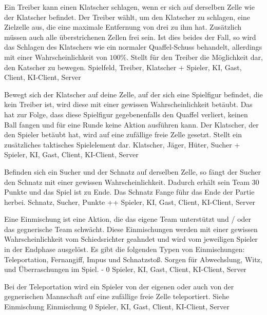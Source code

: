         {Ein Treiber kann einen Klatscher schlagen, wenn er sich auf derselben Zelle wie der Klatscher befindet. Der Treiber wählt, um den Klatscher zu schlagen, eine Zielzelle aus, die eine maximale Entfernung von drei zu ihm hat. Zusätzlich müssen auch alle überstrichenen Zellen frei sein. Ist dies beides der Fall, so wird das Schlagen des Klatschers wie ein normaler Quaffel-Schuss behandelt, allerdings mit einer Wahrscheinlichkeit von $100\%$.}
        {Stellt für den Treiber die Möglichkeit dar, den Katscher zu bewegen.}
        {Spielfeld, Treiber, Klatscher}
        {+}
        {Spieler, KI, Gast, Client, KI-Client, Server}
        
        {Bewegt sich der Klatscher auf deine Zelle, auf der sich eine Spielfigur befindet, die kein Treiber ist, wird diese mit einer gewissen Wahrscheinlichkeit betäubt. Das hat zur Folge, dass diese Spielfigur gegebenenfalls den Quaffel verliert, keinen Ball fangen und für eine Runde keine Aktion ausführen kann. Der Klatscher, der den Spieler betäubt hat, wird auf eine zufällige freie Zelle gesetzt.}
        {Stellt ein zusätzliches taktisches Spielelement dar.}
        {Klatscher, Jäger, Hüter, Sucher}
        {+}
        {Spieler, KI, Gast, Client, KI-Client, Server}
        
        {Befinden sich ein Sucher und der Schnatz auf derselben Zelle, so fängt der Sucher den Schnatz mit einer gewissen Wahrscheinlichkeit. Dadurch erhält sein Team 30 Punkte und das Spiel ist zu Ende.}
        {Das Schnatz Fange führ das Ende der Partie herbei.}
        {Schnatz, Sucher, Punkte}
        {++}
        {Spieler, KI, Gast, Client, KI-Client, Server}
        

        {Eine  Einmischung ist eine Aktion, die das eigene Team unterstützt und / oder das gegnerische Team schwächt. Diese Einmischungen werden mit einer gewissen Wahrscheinlichkeit vom Schiedsrichter geahndet und wird vom jeweiligen Spieler in der Endphase ausgelöst. Es gibt die folgenden Typen von Einmischungen: Teleportation, Fernangiff, Impus und Schnatzstoß.}
        {Sorgen für Abwechslung, Witz, und Überraschungen im Spiel.}
        {-}
        {0}
        {Spieler, KI, Gast, Client, KI-Client, Server}

        {Bei der Teleportation wird ein Spieler von der eigenen oder auch von der gegnerischen Mannschaft auf eine zufällige freie Zelle teleportiert.}
        {Siehe Einmischung}
        {Einmischung}
        {0}
        {Spieler, KI, Gast, Client, KI-Client, Server}


